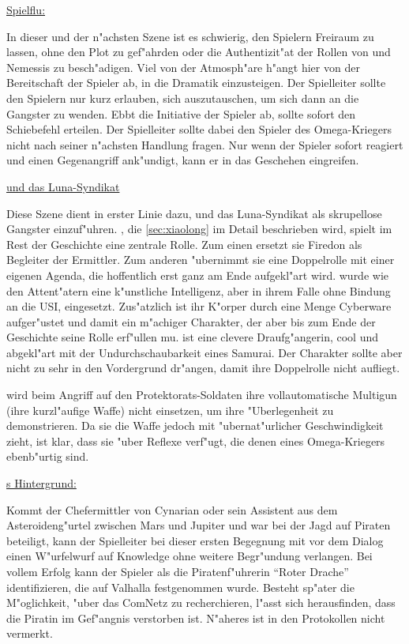 \vfill

\begin{remarks}
	\underline{Spielflu\3:}

	In dieser und der n"achsten Szene ist es schwierig, den Spielern Freiraum zu lassen, ohne den Plot zu gef"ahrden oder die Authentizit"at der Rollen von \xl{} und Nemessis zu besch"adigen. Viel von der Atmosph"are h"angt hier von der Bereitschaft der Spieler ab, in die Dramatik einzusteigen. Der Spielleiter sollte den Spielern nur kurz erlauben, sich auszutauschen, um sich dann an die Gangster zu wenden. Ebbt die Initiative der Spieler ab, sollte \xl{} sofort den Schie\3befehl erteilen. Der Spielleiter sollte dabei den Spieler des Omega-Kriegers nicht nach seiner n"achsten Handlung fragen. Nur wenn der Spieler sofort reagiert und einen Gegenangriff ank"undigt, kann er in das Geschehen eingreifen.

	\underline{\xl{} und das Luna-Syndikat}

	Diese Szene dient in erster Linie dazu, \xl{} und das Luna-Syndikat als skrupellose Gangster einzuf"uhren. \xl{}, die  \cref{sec:xiaolong} im Detail beschrieben wird, spielt im Rest der Geschichte eine zentrale Rolle. Zum einen ersetzt sie Firedon als Begleiter der Ermittler. Zum anderen "ubernimmt sie eine Doppelrolle mit einer eigenen Agenda, die hoffentlich erst ganz am Ende aufgekl"art wird. \xl{} wurde wie den Attent"atern eine k"unstliche Intelligenz, aber in ihrem Falle ohne Bindung an die USI, eingesetzt. Zus"atzlich ist ihr K"orper durch eine Menge Cyberware aufger"ustet und damit ein m"achiger Charakter, der aber bis zum Ende der Geschichte seine Rolle erf"ullen mu\3. \xl{} ist eine clevere Draufg"angerin, cool und abgekl"art mit der Undurchschaubarkeit
	eines Samurai. Der Charakter sollte aber nicht zu sehr in den Vordergrund dr"angen, damit ihre Doppelrolle nicht aufliegt.

	\xl{} wird beim Angriff auf den Protektorats-Soldaten ihre vollautomatische Multigun (ihre kurzl"aufige Waffe) nicht einsetzen, um ihre "Uberlegenheit zu demonstrieren. Da sie die Waffe jedoch mit "ubernat"urlicher Geschwindigkeit zieht, ist klar, dass sie "uber Reflexe verf"ugt, die denen eines Omega-Kriegers ebenb"urtig sind.

	\underline{\xl{}s Hintergrund:}

	Kommt der Chefermittler von Cynarian oder sein Assistent aus dem Asteroideng"urtel zwischen Mars und Jupiter und war bei der Jagd auf Piraten beteiligt, kann der Spielleiter bei dieser ersten Begegnung mit \xl{} vor dem Dialog einen W"urfelwurf auf Knowledge ohne weitere Begr"undung verlangen. Bei vollem Erfolg kann der Spieler \xl{} als die Piratenf"uhrerin "`Roter Drache"' identifizieren, die auf Valhalla festgenommen wurde. Besteht sp"ater die M"oglichkeit, "uber das ComNetz zu recherchieren, l"asst sich herausfinden, dass die Piratin im Gef"angnis verstorben ist. N"aheres ist in den Protokollen nicht vermerkt.
\end{remarks}


